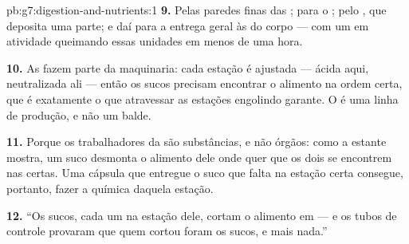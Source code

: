 \begin{solution}{pb:g7:digestion-and-nutrients:1}
\textbf{9.} Pelas paredes finas das ; para o ; pelo
, que deposita uma parte; e daí para a entrega geral às 
do corpo --- com um  em atividade queimando essas unidades em
menos de uma hora.

\textbf{10.} As  fazem parte da maquinaria: cada estação é
ajustada --- ácida aqui, neutralizada ali --- então os sucos precisam
encontrar o alimento na ordem certa, que é exatamente o que atravessar
as estações engolindo garante. O  é uma linha de
produção, e não um balde.

\textbf{11.} Porque os trabalhadores da  são substâncias, e
não órgãos: como a estante mostra, um suco desmonta o alimento dele
onde quer que os dois se encontrem nas  certas. Uma cápsula
que entregue o suco que falta na estação certa consegue, portanto,
fazer a química daquela estação.

\textbf{12.} ``Os sucos, cada um na estação dele, cortam o alimento em
 --- e os tubos de controle provaram que quem cortou foram os
sucos, e mais nada.''
\end{solution}
